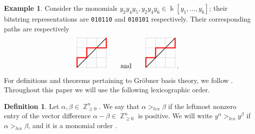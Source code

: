 \documentclass[12pt,reqno]{amsart}
\theoremstyle{plain}
\theoremstyle{definition}
\newtheorem{example}[theorem]{Example}
\newtheorem{definition}[theorem]{Definition}
\DeclareMathOperator{\Z}{\mathbb{Z}}
\def\field{\Bbbk}
\begin{document}
\begin{example}
		Consider the monomials $y_2y_4y_5, y_2y_4y_6 \in \field[y_1, \dots, y_6]$; their bitstring representations are \texttt{010110} and \texttt{010101} respectively. 
		Their corresponding paths are respectively
$$
\begin{tikzpicture}[scale=0.5] 
	\draw[help lines] (0,0) grid +(3,3);
	\draw[thick] (0,0) -- +(3,3);
	\draw[line width=1.5pt, draw = red] (0,0)--(0,1)--(1,1)--(1,2)--(2,2)--(3,2)--(3,3);
\end{tikzpicture}
\qquad \text{and} \qquad
\begin{tikzpicture}[scale=0.5] 
	\draw[help lines] (0,0) grid +(3,3);
	\draw[thick] (0,0) -- +(3,3);
	\draw[line width=1.5pt, draw = red] (0,0)--(0,1)--(1,1)--(1,2)--(2,2)--(3,2)--(3,3);
\end{tikzpicture}\,.
$$
\end{example}

For definitions and theorems pertaining to Gr\"obner basis theory, we follow \cite{iva}.  Throughout this paper we will use the following lexicographic order.
\begin{definition} \label{lex}
	Let $\alpha, \beta \in \Z^n_{\geq 0}$. We say that $\alpha >_{lex} \beta$ if the leftmost nonzero entry of the vector difference $\alpha - \beta \in \Z^n_{\geq 0}$ is positive. 
	We will write $y^\alpha >_{lex} y^\beta$ if $\alpha >_{lex} \beta$, and  it is a monomial order \cite[\S2 \textemdash Proposition 4]{iva}. 
\end{definition}
\end{document}
